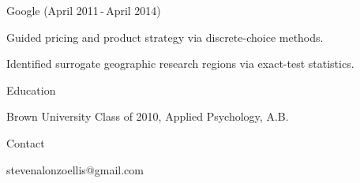 \documentclass[12pt]{res}
\begin{document}
{\begin{resume}
\begin{minipage}{7.9in}
\begin{list}{}{\leftmargin=0em}
{\begin{list}{-}{\leftmargin=1em}
\item{Google (April  2011\,-\,April  2014)
\begin{list}{--}{\leftmargin=1em}
\item Guided pricing and product strategy via discrete-choice methods.
\item Identified surrogate geographic research regions via exact-test statistics.
\end{list}}
\end{list}}

\item{Education\dotfill 
\begin{list}{-}{\leftmargin=1em}
\item Brown University Class of 2010, Applied Psychology, A.B.
\end{list}}

\item{Contact\dotfill 
\begin{list}{-}{\leftmargin=1em}
\item stevenalonzoellis@gmail.com
\end{list}}
\end{list}

\vspace{3.35in}


\end{minipage}
\end{resume}
} %
\end{document}
